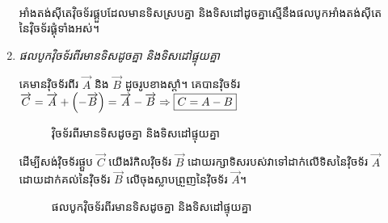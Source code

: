 \begin{enumerate}[m]
\begin{align*}
	\end{align*}
	\begin{generality}
		អាំងតង់សុីតេវុិចទ័រផ្គួបដែលមានទិសស្របគ្នា និងទិសដៅដូចគ្នាស្មើនឹងផលបូកអាំងតង់សុីតេនៃវុិចទ័រផ្គុំទាំងអស់។
	\end{generality}
	\item \emph{\kml ផលបូកវុិចទ័រពីរមានទិសដូចគ្នា និងទិសដៅផ្ទុយគ្នា}
	\begin{multicols}{2}
		គេមានវុិចទ័រពីរ $\overrightarrow{A}$ និង $\overrightarrow{B}$ ដូចរូបខាងស្តាំ។ គេបានវុិចទ័រ $\overrightarrow{C}=\overrightarrow{A}+\left(-\overrightarrow{B}\right)=\overrightarrow{A}-\overrightarrow{B}\Rightarrow\fbox{$C=A-B$}$\\
		\begin{figure}[H]
			\centering
			\caption{វុិចទ័រពីរមានទិសដូចគ្នា និងទិសដៅផ្ទុយគ្នា}
		\end{figure}
	\end{multicols}
	\begin{multicols}{2}
		ដើម្បីសង់វុិចទ័រផ្គួប $\overrightarrow{C}$ យើងរំកិលវុិចទ័រ $\overrightarrow{B}$ ដោយរក្សាទិសរបស់វាទៅដាក់លើទិសនៃវុិចទ័រ $\overrightarrow{A}$ ដោយដាក់គល់នៃវុិចទ័រ $\overrightarrow{B}$ លើចុងស្លាបព្រួញនៃវុិចទ័រ $\overrightarrow{A}$។
		\begin{figure}[H]
			\centering
			\caption{\ak ផលបូកវុិចទ័រពីរមានទិសដូចគ្នា និងទិសដៅផ្ទុយគ្នា}

\end{figure}
\end{multicols}
\end{enumerate}
